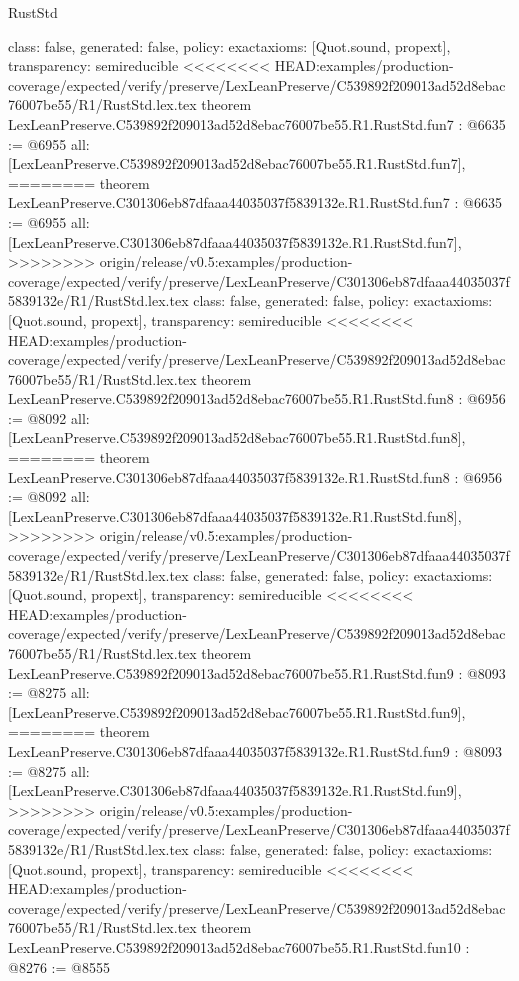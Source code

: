 \begin{lexlean}{RustStd}
\begin{coremodule}
{\begin{coremodule}
{{{{{{{{{{  class: false,
  generated: false,
  policy: exact{axioms: [Quot.sound, propext]},
  transparency: semireducible
}
<<<<<<<< HEAD:examples/production-coverage/expected/verify/preserve/LexLeanPreserve/C539892f209013ad52d8ebac76007be55/R1/RustStd.lex.tex
theorem LexLeanPreserve.C539892f209013ad52d8ebac76007be55.R1.RustStd.fun7 : @6635 := @6955 {
  all: [LexLeanPreserve.C539892f209013ad52d8ebac76007be55.R1.RustStd.fun7],
========
theorem LexLeanPreserve.C301306eb87dfaaa44035037f5839132e.R1.RustStd.fun7 : @6635 := @6955 {
  all: [LexLeanPreserve.C301306eb87dfaaa44035037f5839132e.R1.RustStd.fun7],
>>>>>>>> origin/release/v0.5:examples/production-coverage/expected/verify/preserve/LexLeanPreserve/C301306eb87dfaaa44035037f5839132e/R1/RustStd.lex.tex
  class: false,
  generated: false,
  policy: exact{axioms: [Quot.sound, propext]},
  transparency: semireducible
}
<<<<<<<< HEAD:examples/production-coverage/expected/verify/preserve/LexLeanPreserve/C539892f209013ad52d8ebac76007be55/R1/RustStd.lex.tex
theorem LexLeanPreserve.C539892f209013ad52d8ebac76007be55.R1.RustStd.fun8 : @6956 := @8092 {
  all: [LexLeanPreserve.C539892f209013ad52d8ebac76007be55.R1.RustStd.fun8],
========
theorem LexLeanPreserve.C301306eb87dfaaa44035037f5839132e.R1.RustStd.fun8 : @6956 := @8092 {
  all: [LexLeanPreserve.C301306eb87dfaaa44035037f5839132e.R1.RustStd.fun8],
>>>>>>>> origin/release/v0.5:examples/production-coverage/expected/verify/preserve/LexLeanPreserve/C301306eb87dfaaa44035037f5839132e/R1/RustStd.lex.tex
  class: false,
  generated: false,
  policy: exact{axioms: [Quot.sound, propext]},
  transparency: semireducible
}
<<<<<<<< HEAD:examples/production-coverage/expected/verify/preserve/LexLeanPreserve/C539892f209013ad52d8ebac76007be55/R1/RustStd.lex.tex
theorem LexLeanPreserve.C539892f209013ad52d8ebac76007be55.R1.RustStd.fun9 : @8093 := @8275 {
  all: [LexLeanPreserve.C539892f209013ad52d8ebac76007be55.R1.RustStd.fun9],
========
theorem LexLeanPreserve.C301306eb87dfaaa44035037f5839132e.R1.RustStd.fun9 : @8093 := @8275 {
  all: [LexLeanPreserve.C301306eb87dfaaa44035037f5839132e.R1.RustStd.fun9],
>>>>>>>> origin/release/v0.5:examples/production-coverage/expected/verify/preserve/LexLeanPreserve/C301306eb87dfaaa44035037f5839132e/R1/RustStd.lex.tex
  class: false,
  generated: false,
  policy: exact{axioms: [Quot.sound, propext]},
  transparency: semireducible
}
<<<<<<<< HEAD:examples/production-coverage/expected/verify/preserve/LexLeanPreserve/C539892f209013ad52d8ebac76007be55/R1/RustStd.lex.tex
theorem LexLeanPreserve.C539892f209013ad52d8ebac76007be55.R1.RustStd.fun10 : @8276 := @8555 {
}}}}}}}}}}}}}
\end{coremodule}}
\end{coremodule}
\end{lexlean}
